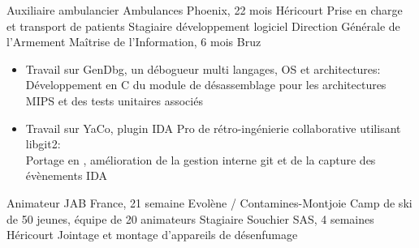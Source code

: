 \documentclass[a4paper,10pt,sans]{moderncv}
\renewcommand{\deletedSpace}{0mm}
\begin{document}
            \vspace{5pt}
            {Auxiliaire ambulancier}
            {Ambulances Phoenix, 2\times{}2 mois}
            {Héricourt}
            {Prise en charge et transport de patients}
            {}
            {Stagiaire développement logiciel }
            {Direction Générale de l'Armement Maîtrise de l'Information, 6 mois}
            {Bruz}
            {}
            {}
            \vspace{-5pt}
            \begin{itemize}
                \item Travail sur GenDbg, un débogueur multi langages, OS et architectures:\\
                    \phantom{=}Développement en C du module de désassemblage pour les architectures MIPS et des tests unitaires associés
                \item Travail sur YaCo, plugin IDA Pro de rétro-ingénierie collaborative utilisant libgit2:\\
                    \phantom{=}Portage en \Cpp{}, amélioration de la gestion interne git et de la capture des évènements IDA
            \end{itemize}
            \vspace{5pt}
            {Animateur}
            {JAB France, 2\times{}1 semaine}
            {Evolène / Contamines-Montjoie}
            {Camp de ski de 50 jeunes, équipe de 20 animateurs}
            {}
            {Stagiaire}
            {Souchier SAS, 4 semaines}
            {Héricourt}
            {Jointage et montage d'appareils de désenfumage}
            {}


    \vspace*{\deletedSpace}
\end{document}
